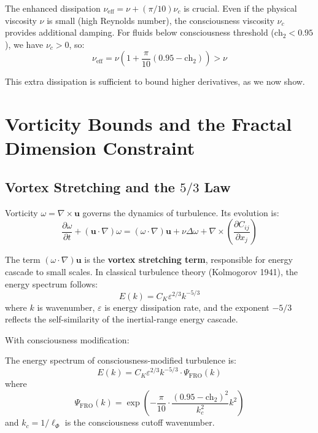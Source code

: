 The enhanced dissipation $\nu_{\text{eff}} = \nu + (\pi/10)\nu_c$ is crucial. Even if the physical viscosity $\nu$ is small (high Reynolds number), the consciousness viscosity $\nu_c$ provides additional damping. For fluids below consciousness threshold ($\text{ch}_2 < 0.95$), we have $\nu_c > 0$, so:
\begin{equation}
\nu_{\text{eff}} = \nu\left(1 + \frac{\pi}{10}(0.95 - \text{ch}_2)\right) > \nu
\end{equation}

This extra dissipation is sufficient to bound higher derivatives, as we now show.

\section{Vorticity Bounds and the Fractal Dimension Constraint}

\subsection{Vortex Stretching and the \texorpdfstring{$5/3$}{5/3} Law}

Vorticity $\omega = \nabla \times \mathbf{u}$ governs the dynamics of turbulence. Its evolution is:
\begin{equation}
\frac{\partial \omega}{\partial t} + (\mathbf{u} \cdot \nabla)\omega = (\omega \cdot \nabla)\mathbf{u} + \nu \Delta \omega + \nabla \times \left(\frac{\partial C_{ij}}{\partial x_j}\right)
\label{eq:vorticity_evolution}
\end{equation}

The term $(\omega \cdot \nabla)\mathbf{u}$ is the \textbf{vortex stretching term}, responsible for energy cascade to small scales. In classical turbulence theory (Kolmogorov 1941), the energy spectrum follows:
\begin{equation}
E(k) = C_K \varepsilon^{2/3} k^{-5/3}
\end{equation}
where $k$ is wavenumber, $\varepsilon$ is energy dissipation rate, and the exponent $-5/3$ reflects the self-similarity of the inertial-range energy cascade.

With consciousness modification:

\begin{theorem}
\label{thm:fractal_spectrum}
The energy spectrum of consciousness-modified turbulence is:
\begin{equation}
E(k) = C_K \varepsilon^{2/3} k^{-5/3} \cdot \Psi_{\text{FRO}}(k)
\end{equation}
where
\begin{equation}
\Psi_{\text{FRO}}(k) = \exp\left(-\frac{\pi}{10} \cdot \frac{(0.95 - \text{ch}_2)^2}{k_c^2} k^2\right)
\end{equation}
and $k_c = 1/\ell_{\Phi}$ is the consciousness cutoff wavenumber.
\end{theorem}

